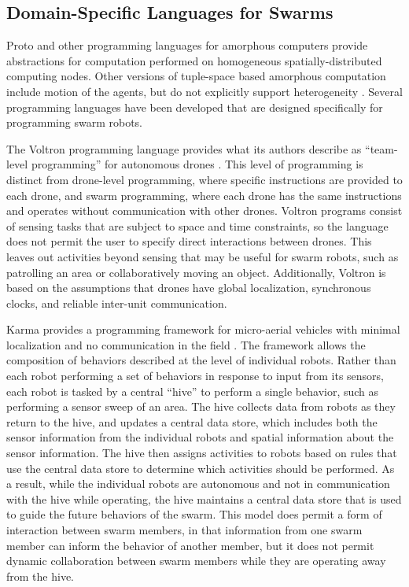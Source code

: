\subsection{Domain-Specific Languages for Swarms} \label{section:Domain_Specific_Languages_for_Swarms}

Proto and other programming languages for amorphous computers provide abstractions for computation performed on homogeneous spatially-distributed computing nodes. 
Other versions of tuple-space based amorphous computation include motion of the agents, but do not explicitly support heterogeneity \citep{viroli2012linda}.
Several programming languages have been developed that are designed specifically for programming swarm robots.

The Voltron programming language provides what its authors describe as ``team-level programming'' for autonomous drones \citep{mottola2014team}.
This level of programming is distinct from drone-level programming, where specific instructions are provided to each drone, and swarm programming, where each drone has the same instructions and operates without communication with other drones.
Voltron programs consist of sensing tasks that are subject to space and time constraints, so the language does not permit the user to specify direct interactions between drones. 
This leaves out activities beyond sensing that may be useful for swarm robots, such as patrolling an area or collaboratively moving an object.
Additionally, Voltron is based on the assumptions that drones have global localization, synchronous clocks, and reliable inter-unit communication.   

Karma provides a programming framework for micro-aerial vehicles with minimal localization and no communication in the field \citep{dantu2011programming}.
The framework allows the composition of behaviors described at the level of individual robots. 
Rather than each robot performing a set of behaviors in response to input from its sensors, each robot is tasked by a central ``hive'' to perform a single behavior, such as performing a sensor sweep of an area. 
The hive collects data from robots as they return to the hive, and updates a central data store, which includes both the sensor information from the individual robots and spatial information about the sensor information. 
The hive then assigns activities to robots based on rules that use the central data store to determine which activities should be performed. 
As a result, while the individual robots are autonomous and not in communication with the hive while operating, the hive maintains a central data store that is used to guide the future behaviors of the swarm. 
This model does permit a form of interaction between swarm members, in that information from one swarm member can inform the behavior of another member, but it does not permit dynamic collaboration between swarm members while they are operating away from the hive. 

